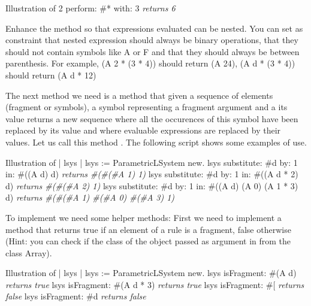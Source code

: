 \begin{scriptwithtitle}{Illustration of }
2 perform: #* with: 3
\emph{returns 6}
\end{scriptwithtitle}



\begin{exonofig}
Enhance the method  so that expressions evaluated can be
nested.  You can set as constraint that nested expression should
always be binary operations, that they should not contain symbols like
A or F and that they should always be between parenthesis.  For
example, (A 2 * (3 * 4)) should return (A 24), (A d * (3 * 4)) should
return (A d * 12)
\end{exonofig}

The next method we need is a method that given a sequence of elements
(fragment or symbols), a symbol representing a fragment argument and a
its value returns a new sequence where all the occurences of this
symbol have been replaced by its value and where evaluable expressions
are replaced by their values. Let us call this method
. The following script shows some examples of
 use.

\begin{scriptwithtitle}{Illustration of }
| lsys |
lsys := ParametricLSystem new.
lsys substitute: #d by: 1 in: #((A d) d)
\emph{returns #(#(#A 1) 1)}
lsys substitute: #d by: 1 in: #((A d * 2) d) 
\emph{returns  #(#(#A 2) 1)}
lsys substitute: #d by: 1 in: #((A d) (A 0) (A 1 * 3) d) 
\emph{returns #(#(#A 1) #(#A 0) #(#A 3) 1)}
\end{scriptwithtitle}

To implement  we need some helper methods: First
we need to implement a method that returns true if an element of a rule is
a fragment, false otherwise (Hint: you can check if the class of the object
passed as argument in from the class Array).

\begin{scriptwithtitle}{Illustration of }
| lsys |
lsys := ParametricLSystem new.
lsys isFragment: #(A d)
\emph{returns true}
lsys isFragment: #(A d * 3)
\emph{returns true}
lsys isFragment: #[
\emph{returns false}
lsys isFragment: #d
\emph{returns false}
\end{scriptwithtitle}


